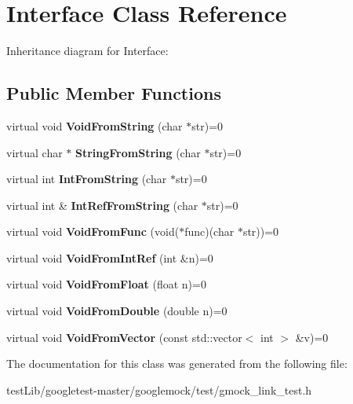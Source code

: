 \hypertarget{classInterface}{}\section{Interface Class Reference}
\label{classInterface}


Inheritance diagram for Interface\+:
\subsection*{Public Member Functions}
\begin{DoxyCompactItemize}
\item 
\mbox{\label{classInterface_a65d6ae604e7e9a513aec72c9c94e0b97}} 
virtual void {\bfseries Void\+From\+String} (char $\ast$str)=0
\item 
\mbox{\label{classInterface_a756b1d22c12aa3f14a5083f90043fbf0}} 
virtual char $\ast$ {\bfseries String\+From\+String} (char $\ast$str)=0
\item 
\mbox{\label{classInterface_ab34c8a5fd2236a6b009f86a4e5851b61}} 
virtual int {\bfseries Int\+From\+String} (char $\ast$str)=0
\item 
\mbox{\label{classInterface_ab93276de67e60c44fd775d4c139aa8e1}} 
virtual int \& {\bfseries Int\+Ref\+From\+String} (char $\ast$str)=0
\item 
\mbox{\label{classInterface_a7dab3c82b857a9a5f52b3ce6f7df547f}} 
virtual void {\bfseries Void\+From\+Func} (void($\ast$func)(char $\ast$str))=0
\item 
\mbox{\label{classInterface_aa43fb56650a57b6b3e7743e54e50cb86}} 
virtual void {\bfseries Void\+From\+Int\+Ref} (int \&n)=0
\item 
\mbox{\label{classInterface_ae2b3e9411c893a45642d3af632752c66}} 
virtual void {\bfseries Void\+From\+Float} (float n)=0
\item 
\mbox{\label{classInterface_aa56524017aabdbe46510648c711ab8a8}} 
virtual void {\bfseries Void\+From\+Double} (double n)=0
\item 
\mbox{\label{classInterface_ae84fe7e53f881db2f823ad35d004927a}} 
virtual void {\bfseries Void\+From\+Vector} (const std\+::vector$<$ int $>$ \&v)=0
\end{DoxyCompactItemize}


The documentation for this class was generated from the following file\+:\begin{DoxyCompactItemize}
\item 
test\+Lib/googletest-\/master/googlemock/test/gmock\+\_\+link\+\_\+test.\+h\end{DoxyCompactItemize}
